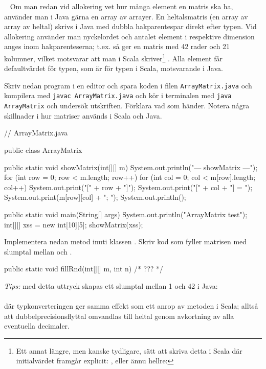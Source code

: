 \QUESTBEGIN

\Task \label{task:arraymatrix-java} \what~   Om man redan vid allokering vet hur många element en matris ska ha, använder man i Java gärna en array av arrayer. En heltalsmatris (en array av array av heltal) skrivs i Java med dubbla hakparentespar  direkt efter typen. Vid allokering använder man nyckelordet  och antalet element i respektive dimension anges inom hakparenteserna; t.ex. så ger  en matris med 42 rader och 21 kolumner, vilket motsvarar att man i Scala skriver\footnote{Ett annat längre, men kanske tydligare, sätt att skriva detta i Scala där initialvärdet framgår explicit: , eller ännu hellre: }  . Alla element får defaultvärdet för typen, som är  för typen  i Scala, motsvarande  i Java.

\Subtask Skriv nedan program i en editor och spara koden i filen \texttt{ArrayMatrix.java} och kompilera med \texttt{javac ArrayMatrix.java} och kör i terminalen med \texttt{java ArrayMatrix} och undersök utskriften. Förklara vad som händer. Notera några skillnader i hur matriser används i Scala och Java.


\begin{Code}[language=Java]
// ArrayMatrix.java

public class ArrayMatrix {

    public static void showMatrix(int[][] m){
        System.out.println("\n--- showMatrix ---");
        for (int row = 0; row < m.length; row++){
            for (int col = 0; col < m[row].length; col++) {
                System.out.print("[" + row + "]");
                System.out.print("[" + col + "] = ");
                System.out.print(m[row][col] + "; ");
            }
            System.out.println();
        }
    }

    public static void main(String[] args) {
        System.out.println("ArrayMatrix test");
        int[][] xss = new int[10][5];
        showMatrix(xss);
    }
}
\end{Code}

\Subtask Implementera nedan metod  inuti klassen . Skriv kod som fyller matrisen  med slumptal mellan  och .
\begin{Code}[language=Java]
    public static void fillRnd(int[][] m, int n){
        /* ??? */
    }
\end{Code}
\noindent \emph{Tips:} med detta uttryck skapas ett slumptal mellan 1 och 42 i Java:\\
 \\
där typkonverteringen  ger samma effekt som ett anrop av metoden  i Scala; alltså att dubbelprecisionsflyttal omvandlas till heltal genom avkortning av alla eventuella decimaler.


